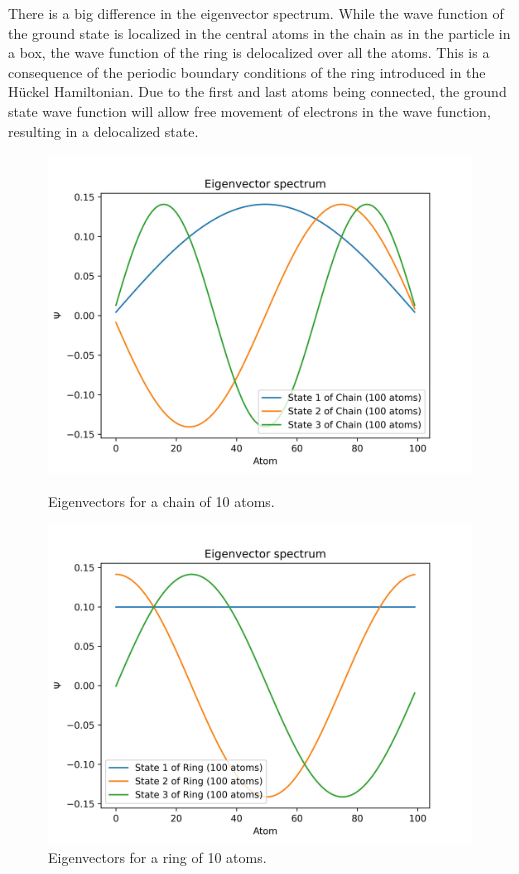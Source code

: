 \documentclass{article}
\begin{document}
There is a big difference in the eigenvector spectrum. While the wave function of the ground state is localized in the central atoms in the chain as in the particle in a box, the wave function of the ring is delocalized over all the atoms. This is a consequence of the periodic boundary conditions of the ring introduced in the Hückel Hamiltonian. Due to the first and last atoms being connected, the ground state wave function will allow free movement of electrons in the wave function, resulting in a delocalized state.


\begin{figure}[h]
    \centering
    \begin{minipage}{0.45\textwidth}
        \centering
        \includegraphics[width=\textwidth]{Figures/chain_eigenvectors.jpg}
        \caption{Eigenvectors for a chain of 10 atoms.}
        \label{fig:chain_eigenvectors}
    \end{minipage}
    \hfill
    \begin{minipage}{0.45\textwidth}
        \centering
        \includegraphics[width=\textwidth]{Figures/ring_eigenvectors.jpg}
        \caption{Eigenvectors for a ring of 10 atoms.}
        \label{fig:ring_eigenvectors}
    \end{minipage}
\end{figure}
\end{document}
